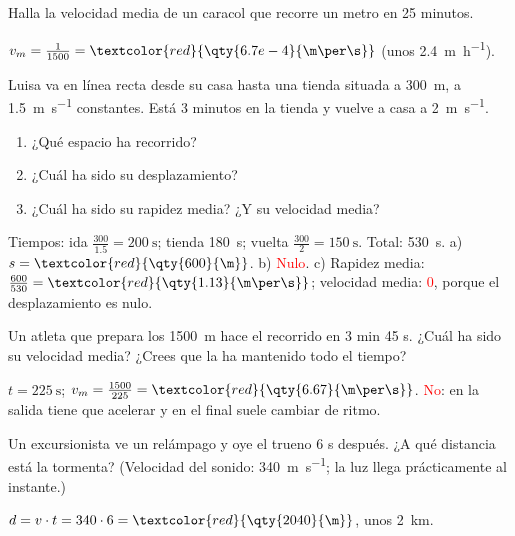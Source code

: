\begin{exercise}
    Halla la velocidad media de un caracol que recorre un metro en 25 minutos.
    \begin{solu}
        \(v_m = \frac{1}{1500} = \textcolor{red}{\qty{6.7e-4}{\m\per\s}}\) (unos \qty{2.4}{\m\per\hour}).
    \end{solu}
\end{exercise}

\begin{exercise}
    Luisa va en línea recta desde su casa hasta una tienda situada a \qty{300}{\m}, a \qty{1.5}{\m\per\s} constantes. Está 3 minutos en la tienda y vuelve a casa a \qty{2}{\m\per\s}.
    \begin{enumerate}[label=\alph*)]
        \item ¿Qué espacio ha recorrido?
        \item ¿Cuál ha sido su desplazamiento?
        \item ¿Cuál ha sido su rapidez media? ¿Y su velocidad media?
    \end{enumerate}
    \begin{solu}
        Tiempos: ida \(\frac{300}{\num{1.5}} = \qty{200}{\s}\); tienda \qty{180}{\s}; vuelta \(\frac{300}{2} = \qty{150}{\s}\). Total: \qty{530}{\s}.
        a) \(s = \textcolor{red}{\qty{600}{\m}}\). b) \textcolor{red}{Nulo}. c) Rapidez media: \(\frac{600}{530} = \textcolor{red}{\qty{1.13}{\m\per\s}}\); velocidad media: \textcolor{red}{0}, porque el desplazamiento es nulo.
    \end{solu}
\end{exercise}

\begin{exercise}
    Un atleta que prepara los \qty{1500}{\m} hace el recorrido en 3 min 45 s. ¿Cuál ha sido su velocidad media? ¿Crees que la ha mantenido todo el tiempo?
    \begin{solu}
        \(t = \qty{225}{\s}\); \(v_m = \frac{1500}{225} = \textcolor{red}{\qty{6.67}{\m\per\s}}\). \textcolor{red}{No}: en la salida tiene que acelerar y en el final suele cambiar de ritmo.
    \end{solu}
\end{exercise}

\begin{exercise}
    Un excursionista ve un relámpago y oye el trueno 6 s después. ¿A qué distancia está la tormenta? (Velocidad del sonido: \qty{340}{\m\per\s}; la luz llega prácticamente al instante.)
    \begin{solu}
        \(d = v \cdot t = 340 \cdot 6 = \textcolor{red}{\qty{2040}{\m}}\), unos \qty{2}{\km}.
    \end{solu}
\end{exercise}

